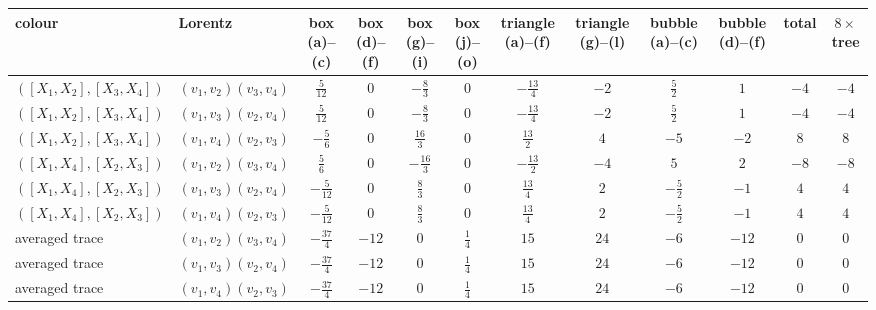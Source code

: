 \begin{tabular}{l|l|c|c|c|c|c|c|c|c|c|c}
colour & Lorentz & box (a)--(c) & box (d)--(f) & box (g)--(i) & box (j)--(o) & triangle (a)--(f) & triangle (g)--(l) & bubble (a)--(c) & bubble (d)--(f) & total & $8\times$tree \\
\hline
$([X_1,X_2],[X_3,X_4])$ & $(v_1,v_2)(v_3,v_4)$ & $\tfrac{5}{12}$ & $0$ & $-\tfrac{8}{3}$ & $0$ & $-\tfrac{13}{4}$ & $-2$ & $\tfrac{5}{2}$ & $1$ & $-4$ & $-4$ \\
$([X_1,X_2],[X_3,X_4])$ & $(v_1,v_3)(v_2,v_4)$ & $\tfrac{5}{12}$ & $0$ & $-\tfrac{8}{3}$ & $0$ & $-\tfrac{13}{4}$ & $-2$ & $\tfrac{5}{2}$ & $1$ & $-4$ & $-4$ \\
$([X_1,X_2],[X_3,X_4])$ & $(v_1,v_4)(v_2,v_3)$ & $-\tfrac{5}{6}$ & $0$ & $\tfrac{16}{3}$ & $0$ & $\tfrac{13}{2}$ & $4$ & $-5$ & $-2$ & $8$ & $8$ \\
$([X_1,X_4],[X_2,X_3])$ & $(v_1,v_2)(v_3,v_4)$ & $\tfrac{5}{6}$ & $0$ & $-\tfrac{16}{3}$ & $0$ & $-\tfrac{13}{2}$ & $-4$ & $5$ & $2$ & $-8$ & $-8$ \\
$([X_1,X_4],[X_2,X_3])$ & $(v_1,v_3)(v_2,v_4)$ & $-\tfrac{5}{12}$ & $0$ & $\tfrac{8}{3}$ & $0$ & $\tfrac{13}{4}$ & $2$ & $-\tfrac{5}{2}$ & $-1$ & $4$ & $4$ \\
$([X_1,X_4],[X_2,X_3])$ & $(v_1,v_4)(v_2,v_3)$ & $-\tfrac{5}{12}$ & $0$ & $\tfrac{8}{3}$ & $0$ & $\tfrac{13}{4}$ & $2$ & $-\tfrac{5}{2}$ & $-1$ & $4$ & $4$ \\
averaged trace & $(v_1,v_2)(v_3,v_4)$ & $-\tfrac{37}{4}$ & $-12$ & $0$ & $\tfrac{1}{4}$ & $15$ & $24$ & $-6$ & $-12$ & $0$ & $0$ \\
averaged trace & $(v_1,v_3)(v_2,v_4)$ & $-\tfrac{37}{4}$ & $-12$ & $0$ & $\tfrac{1}{4}$ & $15$ & $24$ & $-6$ & $-12$ & $0$ & $0$ \\
averaged trace & $(v_1,v_4)(v_2,v_3)$ & $-\tfrac{37}{4}$ & $-12$ & $0$ & $\tfrac{1}{4}$ & $15$ & $24$ & $-6$ & $-12$ & $0$ & $0$ \\
\end{tabular}


